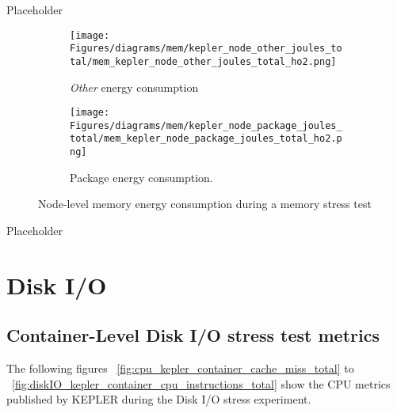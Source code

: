 Placeholder

\begin{figure}[H]
    \centering
    \begin{subfigure}{0.49\textwidth}
        \texttt{[image: Figures/diagrams/mem/kepler\_node\_other\_joules\_total/mem\_kepler\_node\_other\_joules\_total\_ho2.png]}
        \caption{\textit{Other} energy consumption}
    \end{subfigure}
    \begin{subfigure}{0.49\textwidth}
        \texttt{[image: Figures/diagrams/mem/kepler\_node\_package\_joules\_total/mem\_kepler\_node\_package\_joules\_total\_ho2.png]}
        \caption{Package energy consumption.}
    \end{subfigure}
    \caption{Node-level memory energy consumption during a memory stress test}
\end{figure}

Placeholder

\section{Disk I/O}

\subsection{Container-Level Disk I/O stress test metrics}

The following figures ~\ref{fig:cpu_kepler_container_cache_miss_total} to ~\ref{fig:diskIO_kepler_container_cpu_instructions_total} show the CPU metrics published by KEPLER during the Disk I/O stress experiment.

